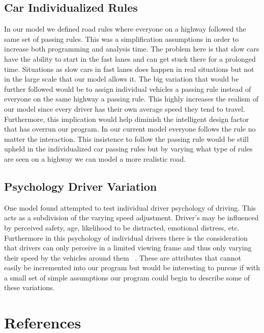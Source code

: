 \documentclass{amsart}
\begin{document}
	\subsection{Car Individualized Rules}
	In our model we defined road rules where everyone on a highway followed the same set of passing rules.  This was a simplification assumptions in order to increase both programming and analysis time.  The problem here is that slow cars have the ability to start in the fast lanes and can get stuck there for a prolonged time.  Situations as slow cars in fast lanes does happen in real situations but not in the large scale that our model allows it. 
	The big variation that would be further followed would be to assign individual vehicles a passing rule instead of everyone on the same highway a passing rule.  This highly increases the realism of our model since every driver has their own average speed they tend to travel.  Furthermore, this implication would help diminish the intelligent design factor that has overrun our program.  In our current model everyone follows the rule no matter the interaction.  This insistence to follow the passing rule would be still upheld in the individualized car passing rules but by varying what type of rules are seen on a highway we can model a more realistic road.  
	
	\subsection{Psychology Driver Variation}
	One model found attempted to test individual driver psychology of driving.  This acts as a subdivision of the varying speed adjustment.  Driver's may be influenced by perceived safety, age, likelihood to be distracted, emotional distress, etc.  Furthermore in this psychology of individual drivers there is the consideration that drivers can only perceive in a limited viewing frame and thus only varying their speed by the vehicles around them ~\cite{burghout2005}.  These are attributes that cannot easily be incremented into our program but would be interesting to pursue if with a small set of simple assumptions our program could begin to describe some of these variations.     


\newpage
\section{\bfseries{References}}

\end{document}

